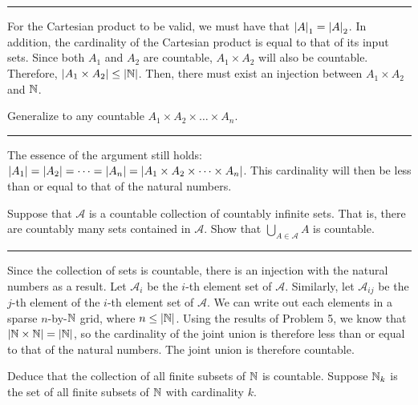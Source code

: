 \documentclass{article}
\begin{document}
\hrule

For the Cartesian product to be valid, we must have that $\left\lvert A \right\rvert_1 = \left\lvert A \right\rvert_2$.
In addition, the cardinality of the Cartesian product is equal to that of its input sets.
Since both $A_1$ and $A_2$ are countable, $A_1 \times A_2$ will also be countable.
Therefore, $\left\lvert A_1 \times A_2 \right\rvert \leq \left\lvert\mathbb N \right\rvert$.
Then, there must exist an injection between $A_1 \times A_2$ and $\mathbb N$.

\subproblema{}
Generalize to any countable $A_1 \times A_2 \times \dots \times A_n$.

\hrule

The essence of the argument still holds: $\left\lvert A_1 \right\rvert = \left\lvert A_2 \right\rvert = \dots = \left\lvert A_n \right\rvert = \left\lvert A_1 \times A_2 \times \dots \times A_n \right\rvert$.
This cardinality will then be less than or equal to that of the natural numbers.

\problem{}

\subproblema{}
Suppose that $\mathcal{A}$ is a countable collection of countably infinite sets.
That is, there are countably many sets contained in $\mathcal{A}$.
Show that $\bigcup \limits_{A \in \mathcal{A}} A$ is countable.

\hrule

Since the collection of sets is countable, there is an injection with the natural numbers as a result.
Let $\mathcal{A}_i$ be the $i$-th element set of $\mathcal{A}$.
Similarly, let $\mathcal{A}_{ij}$ be the $j$-th element of the $i$-th element set of $\mathcal{A}$.
We can write out each elements in a sparse $n$-by-$\mathbb N$ grid, where $n \leq \left\lvert\mathbb N \right\rvert$.
Using the results of Problem 5, we know that $\left\lvert\mathbb N \times \mathbb N \right\rvert = \left\lvert\mathbb N \right\rvert$, so the cardinality of the joint union is therefore less than or equal to that of the natural numbers.
The joint union is therefore countable.

\subproblema{}
Deduce that the collection of all finite subsets of $\mathbb N$ is countable.
Suppose $\mathbb N_k$ is the set of all finite subsets of $\mathbb N$ with cardinality $k$.
\end{document}
